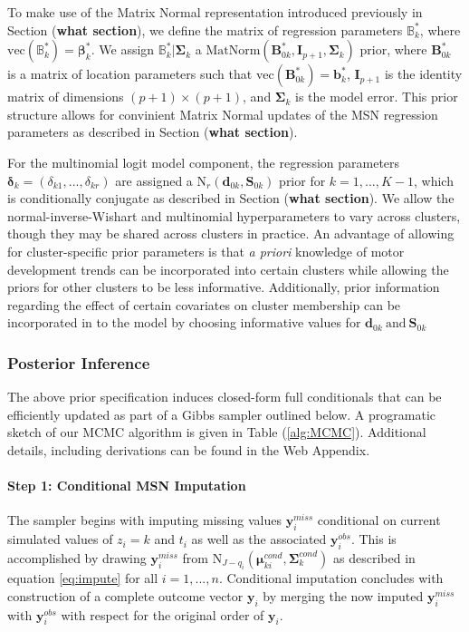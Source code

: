 \documentclass[useAMS,referee]{biom}
\begin{document}
To make use of the Matrix Normal representation introduced previously in Section (\textbf{what section}), we define the matrix of regression parameters $\mathbb{B}^*_k$, where $\text{vec}(\mathbb{B}^*_k) = \boldsymbol\beta^*_k$. We assign $\mathbb{B}^*_k|\boldsymbol\Sigma_k$ a $\text{MatNorm}(\mathbf{B}^*_{0k},\mathbf{I}_{p+1},\boldsymbol\Sigma_k)$ prior, where $\mathbf{B}^*_{0k}$ is a matrix of location parameters such that $\text{vec}(\mathbf{B}^*_{0k}) = \mathbf{b}^*_k$, $\mathbf{I}_{p+1}$ is the identity matrix of dimensions $(p+1)\times(p+1)$, and $\boldsymbol\Sigma_k$ is the model error. This prior structure allows for convinient Matrix Normal updates of the MSN regression parameters as described in Section (\textbf{what section}).

For the multinomial logit model component, the regression parameters $\boldsymbol\delta_k = (\delta_{k1},...,\delta_{kr})$ are assigned a $\text{N}_r(\mathbf{d}_{0k}, \mathbf{S}_{0k})$ prior for $k = 1,...,K-1$, which is conditionally conjugate as described in Section (\textbf{what section}). We allow the normal-inverse-Wishart and multinomial hyperparameters to vary across clusters, though they may be shared across clusters in practice. An advantage of allowing for cluster-specific prior parameters is that \textit{a priori} knowledge of motor development trends can be incorporated into certain clusters while allowing the priors for other clusters to be less informative. Additionally, prior information regarding the effect of certain covariates on cluster membership can be incorporated in to the model by choosing informative values for $\mathbf{d}_{0k} \ \text{and} \ \mathbf{S}_{0k}$

\subsubsection{Posterior Inference} 
The above prior specification induces closed-form full conditionals that can be efficiently updated as part of a Gibbs sampler outlined below. A programatic sketch of our MCMC algorithm is given in Table (\ref{alg:MCMC}). Additional details, including derivations can be found in the Web Appendix. 

\paragraph{\textbf{Step 1}: Conditional MSN Imputation} The sampler begins with imputing missing values $\mathbf{y}_i^{miss}$ conditional on current simulated values of $z_i = k$ and $t_i$ as well as the associated $\mathbf{y}_i^{obs}$. This is accomplished by drawing $\mathbf{y}_i^{miss}$ from $\text{N}_{J-q_i}(\boldsymbol\mu^{cond}_{ki},\boldsymbol\Sigma^{cond}_k)$ as described in equation \ref{eq:impute} for all $i = 1,...,n$. Conditional imputation concludes with construction of a complete outcome vector $\mathbf{y}_i$ by merging the now imputed $\mathbf{y}_i^{miss}$ with $\mathbf{y}_i^{obs}$ with respect for the original order of $\mathbf{y}_i$.
\end{document}
